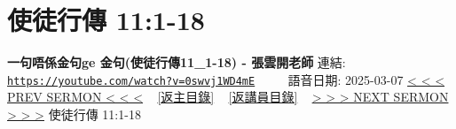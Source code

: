 \documentclass{book}
\begin{document}
\section{使徒行傳 11:1-18}
\label{sec:0swvj1WD4mE}
\textbf{一句唔係金句ge 金句(使徒行傳11\_1-18) - 張雲開老師}
\newline
\newline
連結: \href{https://youtube.com/watch?v=0swvj1WD4mE}{\texttt{https://youtube.com/watch?v=0swvj1WD4mE}} ~~~~ 語音日期: 2025-03-07
\newline
\newline
\hyperref[sec:I2pPy82laUI]{< < < PREV SERMON < < <}
~
\hyperlink{toc}{[返主目錄]}
~
\hyperref[ch:preacher1]{[返講員目錄]}
~
\hyperref[sec:fmQ_KmzoEKE]{> > > NEXT SERMON > > >}
\newline
\newline
使徒行傳 11:1-18
\newline
\end{document}

